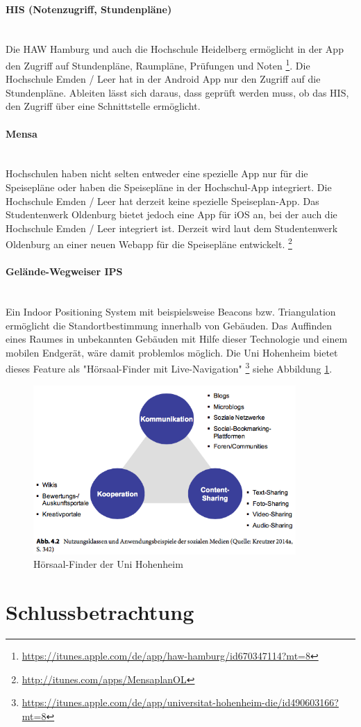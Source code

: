 \documentclass[a4paper, 12pt]{scrreprt}
\begin{document}
\paragraph{HIS (Notenzugriff, Stundenpläne)}\mbox{}\\ %
Die HAW Hamburg und auch die Hochschule Heidelberg ermöglicht in der App den Zugriff auf Stundenpläne, Raumpläne, Prüfungen und Noten \footnote{\url{https://itunes.apple.com/de/app/haw-hamburg/id670347114?mt=8}}. Die Hochschule Emden / Leer hat in der Android App nur den Zugriff auf die Stundenpläne. Ableiten lässt sich daraus, dass geprüft werden muss, ob das HIS, den Zugriff über eine Schnittstelle ermöglicht.

\paragraph{Mensa}\mbox{}\\ %
Hochschulen haben nicht selten entweder eine spezielle App nur für die Speisepläne oder haben die Speisepläne in der Hochschul-App integriert. Die Hochschule Emden / Leer hat derzeit keine spezielle Speiseplan-App. Das Studentenwerk Oldenburg bietet jedoch eine App für iOS an, bei der auch die Hochschule Emden / Leer integriert ist. Derzeit wird laut dem Studentenwerk Oldenburg an einer neuen Webapp für die Speisepläne entwickelt. \footnote{\url{http://itunes.com/apps/MensaplanOL}}

\paragraph{Gelände-Wegweiser IPS}\mbox{}\\ %
Ein Indoor Positioning System mit beispielsweise Beacons bzw. Triangulation ermöglicht die Standortbestimmung innerhalb von Gebäuden. Das Auffinden eines Raumes in unbekannten Gebäuden mit Hilfe dieser Technologie und einem mobilen Endgerät, wäre damit problemlos möglich. Die Uni Hohenheim bietet dieses Feature als "Hörsaal-Finder mit Live-Navigation" \footnote{\url{https://itunes.apple.com/de/app/universitat-hohenheim-die/id490603166?mt=8}} siehe Abbildung \ref{fig_livenavi}.

\begin{figure}[h!]
	\centering
	\includegraphics[width=10cm]{bilder_aurel/nutzungsklassen}
	\caption{Hörsaal-Finder der Uni Hohenheim}
	\label{fig_livenavi}
\end{figure}


\section{Schlussbetrachtung}
\end{document}
